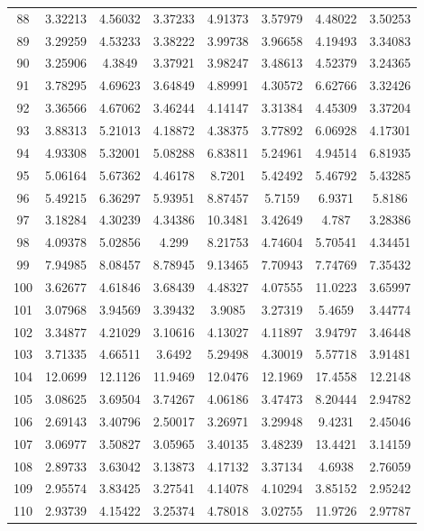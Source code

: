 \begin{center}
\begin{longtable}{cccccccc}
88 & 3.32213 & 4.56032 & 3.37233 & 4.91373 & 3.57979 & 4.48022 & 3.50253\\
89 & 3.29259 & 4.53233 & 3.38222 & 3.99738 & 3.96658 & 4.19493 & 3.34083\\
90 & 3.25906 & 4.3849 & 3.37921 & 3.98247 & 3.48613 & 4.52379 & 3.24365\\
91 & 3.78295 & 4.69623 & 3.64849 & 4.89991 & 4.30572 & 6.62766 & 3.32426\\
92 & 3.36566 & 4.67062 & 3.46244 & 4.14147 & 3.31384 & 4.45309 & 3.37204\\
93 & 3.88313 & 5.21013 & 4.18872 & 4.38375 & 3.77892 & 6.06928 & 4.17301\\
94 & 4.93308 & 5.32001 & 5.08288 & 6.83811 & 5.24961 & 4.94514 & 6.81935\\
95 & 5.06164 & 5.67362 & 4.46178 & 8.7201 & 5.42492 & 5.46792 & 5.43285\\
96 & 5.49215 & 6.36297 & 5.93951 & 8.87457 & 5.7159 & 6.9371 & 5.8186\\
97 & 3.18284 & 4.30239 & 4.34386 & 10.3481 & 3.42649 & 4.787 & 3.28386\\
98 & 4.09378 & 5.02856 & 4.299 & 8.21753 & 4.74604 & 5.70541 & 4.34451\\
99 & 7.94985 & 8.08457 & 8.78945 & 9.13465 & 7.70943 & 7.74769 & 7.35432\\
100 & 3.62677 & 4.61846 & 3.68439 & 4.48327 & 4.07555 & 11.0223 & 3.65997\\
101 & 3.07968 & 3.94569 & 3.39432 & 3.9085 & 3.27319 & 5.4659 & 3.44774\\
102 & 3.34877 & 4.21029 & 3.10616 & 4.13027 & 4.11897 & 3.94797 & 3.46448\\
103 & 3.71335 & 4.66511 & 3.6492 & 5.29498 & 4.30019 & 5.57718 & 3.91481\\
104 & 12.0699 & 12.1126 & 11.9469 & 12.0476 & 12.1969 & 17.4558 & 12.2148\\
105 & 3.08625 & 3.69504 & 3.74267 & 4.06186 & 3.47473 & 8.20444 & 2.94782\\
106 & 2.69143 & 3.40796 & 2.50017 & 3.26971 & 3.29948 & 9.4231 & 2.45046\\
107 & 3.06977 & 3.50827 & 3.05965 & 3.40135 & 3.48239 & 13.4421 & 3.14159\\
108 & 2.89733 & 3.63042 & 3.13873 & 4.17132 & 3.37134 & 4.6938 & 2.76059\\
109 & 2.95574 & 3.83425 & 3.27541 & 4.14078 & 4.10294 & 3.85152 & 2.95242\\
110 & 2.93739 & 4.15422 & 3.25374 & 4.78018 & 3.02755 & 11.9726 & 2.97787\\

\end{longtable}
\end{center}
